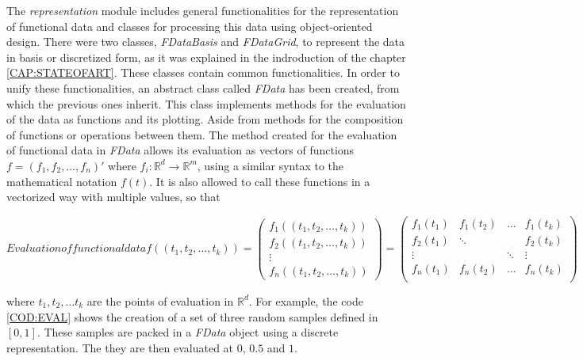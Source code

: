 The \textit{representation} module includes general functionalities for the
representation of functional data and classes for processing this data using
object-oriented design.
There were two classes, \textit{FDataBasis}
and \textit{FDataGrid}, to represent the data in basis or discretized form, as it was explained in the indroduction of the chapter \ref{CAP:STATEOFART}.
These classes contain common functionalities.
In order to unify these functionalities, an abstract class called \textit{FData}
has been created, from which the previous ones inherit. This class implements methods for the
evaluation of the data as functions and its plotting.
Aside from methods for the composition of functions or operations between them.
The method created for the evaluation of functional data in \textit{FData}
allows its evaluation
as vectors of functions $f = (f_1, f_2, \dots, f_n)'$ where
$f_i:\mathbb{R}^d\rightarrow\mathbb{R}^m$, using a similar syntax to the mathematical
notation $f(t)$. It is also allowed to call these functions in a vectorized way with multiple values, so that

\begin{equation}[]{Evaluation of functional data}
f((t_1, t_2, \dots, t_k)) =
\begin{pmatrix}
    f_1((t_1, t_2, \dots, t_k))\\
    f_2((t_1, t_2, \dots, t_k))\\
    \vdots\\
    f_n((t_1, t_2, \dots, t_k))
  \end{pmatrix}
=
\begin{pmatrix}
f_1(t_1) & f_1(t_2) & \dots & f_1(t_k) \\
f_2(t_1) & \ddots &  & f_2(t_k) \\
\vdots &  & \ddots & \vdots \\
f_n(t_1) & f_n(t_2) & \dots & f_n(t_k) \\
\end{pmatrix}
\end{equation}

where $t_1, t_2, \dots t_k$ are the points of evaluation in $\mathbb{R}^d$.
For example, the code \ref{COD:EVAL} shows the creation of a set of three random samples
defined in $[0, 1]$. These samples are packed in a \textit{FData} object
using a discrete representation. The they are then evaluated at $0$, $0.5$ and $1$.

